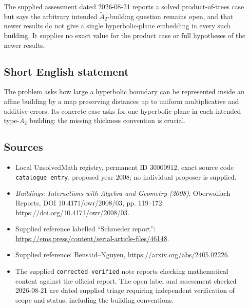 \documentclass[11pt]{article}
\begin{document}
The supplied assessment dated 2026-08-21 reports a solved product-of-trees case but says the arbitrary intended \(\widetilde A_2\)-building question remains open, and that newer results do not give a single hyperbolic-plane embedding in every such building. It supplies no exact value for the product case or full hypotheses of the newer results.
\subsection{Short English statement}
The problem asks how large a hyperbolic boundary can be represented inside an affine building by a map preserving distances up to uniform multiplicative and additive errors. Its concrete case asks for one hyperbolic plane in each intended type-\(\widetilde A_2\) building; the missing thickness convention is crucial.
\subsection{Sources}
\begin{itemize}
\item Local UnsolvedMath registry, permanent ID \(30000912\), exact source code \texttt{catalogue entry}, proposed year 2008; no individual proposer is supplied.
\item \emph{Buildings: Interactions with Algebra and Geometry (2008)}, Oberwolfach Reports, DOI 10.4171/owr/2008/03, pp. 119--172. \url{https://doi.org/10.4171/owr/2008/03}.
\item Supplied reference labelled ``Schroeder report'': \url{https://ems.press/content/serial-article-files/46148}.
\item Supplied reference: Bensaid--Nguyen, \url{https://arxiv.org/abs/2405.02226}.
\item The supplied \texttt{corrected\_verified} note reports checking mathematical content against the official report. The open label and assessment checked 2026-08-21 are dated supplied triage requiring independent verification of scope and status, including the building conventions.
\end{itemize}
\end{document}
